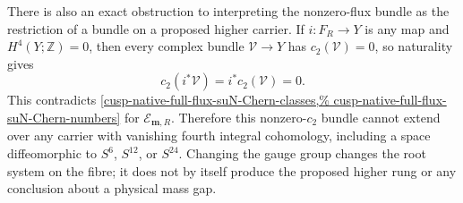 There is also an exact obstruction to interpreting the nonzero-flux bundle
as the restriction of a bundle on a proposed higher carrier.  If
\(i:F_R\to Y\) is any map and \(H^4(Y;\mathbb Z)=0\), then every complex
bundle \(\mathscr V\to Y\) has \(c_2(\mathscr V)=0\), so naturality gives
\[
 c_2(i^*\mathscr V)=i^*c_2(\mathscr V)=0.
\]
This contradicts
\cref{cusp-native-full-flux-suN-Chern-classes,%
cusp-native-full-flux-suN-Chern-numbers} for
\(\mathscr E_{\mathbf m,R}\).  Therefore this nonzero-\(c_2\) bundle cannot
extend over any carrier with vanishing fourth integral cohomology, including
a space diffeomorphic to \(S^6\), \(S^{12}\), or \(S^{24}\).  Changing the
gauge group changes the root system on the fibre; it does not by itself
produce the proposed higher rung or any conclusion about a physical mass
gap.


